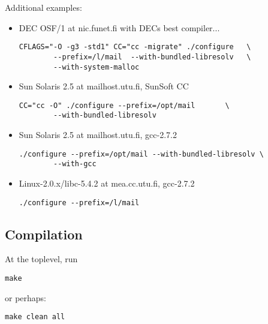 Additional examples:
\begin{itemize}
\item DEC OSF/1 at nic.funet.fi with DECs best compiler...
\begin{tscreen}
\begin{verbatim}
CFLAGS="-O -g3 -std1" CC="cc -migrate" ./configure   \
        --prefix=/l/mail  --with-bundled-libresolv   \
        --with-system-malloc
\end{verbatim}
\end{tscreen}
\item Sun Solaris 2.5  at mailhost.utu.fi, SunSoft CC 
\begin{tscreen}
\begin{verbatim}
CC="cc -O" ./configure --prefix=/opt/mail       \
        --with-bundled-libresolv
\end{verbatim}
\end{tscreen}
\item Sun Solaris 2.5  at mailhost.utu.fi, gcc-2.7.2
\begin{tscreen}
\begin{verbatim}
./configure --prefix=/opt/mail --with-bundled-libresolv \
        --with-gcc
\end{verbatim}
\end{tscreen}
\item Linux-2.0.x/libc-5.4.2 at mea.cc.utu.fi, gcc-2.7.2 
\begin{tscreen}
\begin{verbatim}
./configure --prefix=/l/mail
\end{verbatim}
\end{tscreen}
\end{itemize}



\subsection{Compilation}

At the toplevel, run
\begin{tscreen}
\begin{verbatim}
make
\end{verbatim}
\end{tscreen}

or perhaps:
\begin{tscreen}
\begin{verbatim}
make clean all
\end{verbatim}
\end{tscreen}

